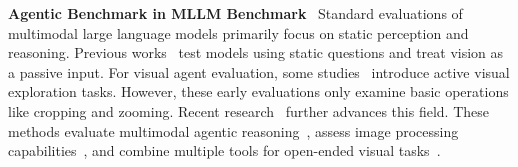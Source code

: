 \documentclass[runningheads]{llncs}
\newcommand{\benchname}{VTC-Bench\xspace}
\begin{document}
\noindent \textbf{Agentic Benchmark in MLLM Benchmark}~
Standard evaluations of multimodal large language models primarily focus on static perception and reasoning. Previous works~\cite{lu2022learn, fu2023mme, lu2023mathvista, shi2025realunifyunifiedmodelstruly,liu2024mmbench, yue2024mmmu,shi2025mmevideoocrevaluatingocrbasedcapabilities,li2025capgeo} test models using static questions and treat vision as a passive input. 
For visual agent evaluation, some studies~\cite{wu2024v, wang2025divide} introduce active visual exploration tasks. However, these early evaluations only examine basic operations like cropping and zooming. Recent research~\cite{wang2024gta, guo2025octopus, li2025tir, guo2025beyond,su2026agentvista,ashraf2025agentx} further advances this field. These methods evaluate multimodal agentic reasoning~\cite{guo2025octopus}, assess image processing capabilities~\cite{li2025tir}, and combine multiple tools for open-ended visual tasks~\cite{guo2025beyond}. 
\end{document}
